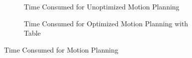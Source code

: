 \begin{figure}[!htbp] %
	\centering
	\begin{subfigure}[b]{0.4\textwidth}
		\caption{Time Consumed for Unoptimized Motion Planning }
		\label{fig:bm1tu}
	\end{subfigure}
	\begin{subfigure}[b]{0.4\textwidth}
		\caption{Time Consumed for Optimized Motion Planning with Table}  
		\label{fig:bm1to}
	\end{subfigure}	
	\caption{Time Consumed for Motion Planning}
	\label{fig:bmt}
\end{figure}

